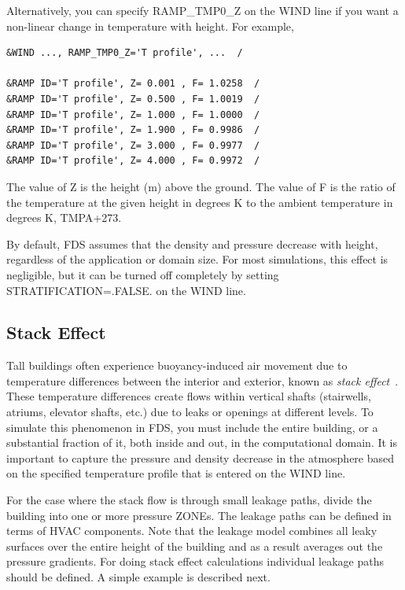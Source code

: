 \documentclass[11pt]{book}
\begin{document}
Alternatively, you can specify {\ct RAMP\_TMP0\_Z} on the {\ct WIND} line if you want a non-linear change in temperature with height. For example,
\begin{lstlisting}
&WIND ..., RAMP_TMP0_Z='T profile', ...  /

&RAMP ID='T profile', Z= 0.001 , F= 1.0258  /
&RAMP ID='T profile', Z= 0.500 , F= 1.0019  /
&RAMP ID='T profile', Z= 1.000 , F= 1.0000  /
&RAMP ID='T profile', Z= 1.900 , F= 0.9986  /
&RAMP ID='T profile', Z= 3.000 , F= 0.9977  /
&RAMP ID='T profile', Z= 4.000 , F= 0.9972  /
\end{lstlisting}
The value of {\ct Z} is the height (m) above the ground. The value of {\ct F} is the ratio of the temperature at the given height in degrees K to the ambient temperature in degrees K, {\ct TMPA}+273.

By default, FDS assumes that the density and pressure decrease with height, regardless of the application or domain size. For most simulations, this effect is negligible, but it can be turned off completely by setting {\ct STRATIFICATION=.FALSE.} on the {\ct WIND} line.

\subsection{Stack Effect}
\label{info:stackeffect}
\label{stack_effect}

Tall buildings often experience buoyancy-induced air movement due to temperature differences between the interior and exterior, known as {\em stack effect}~\cite{Klote_Milke}. These temperature differences create flows within vertical shafts (stairwells, atriums, elevator shafts, etc.) due to leaks or openings at different levels. To simulate this phenomenon in FDS, you must include the entire building, or a substantial fraction of it, both inside and out, in the computational domain. It is important to capture the pressure and density decrease in the atmosphere based on the specified temperature profile that is entered on the {\ct WIND} line.

For the case where the stack flow is through small leakage paths, divide the building into one or more pressure {\ct ZONE}s. The leakage paths can be defined in terms of HVAC components. Note that the leakage model combines all leaky surfaces over the entire height of the building and as a result averages out the pressure gradients. For doing stack effect calculations individual leakage paths should be defined. A simple example is described next.
\end{document}
